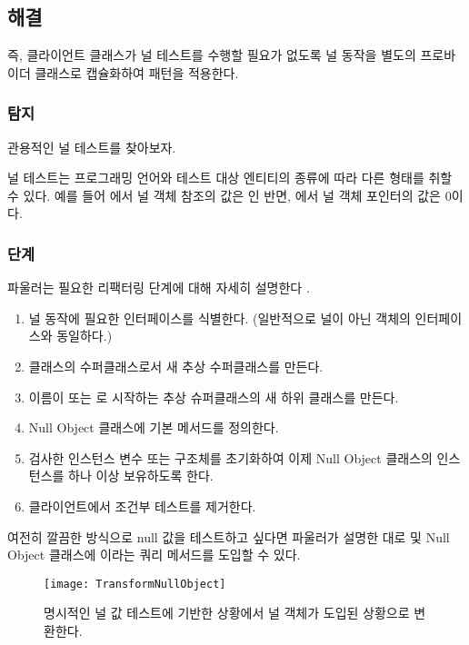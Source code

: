 \documentclass[a4paper,10pt,twoside]{book}
\begin{document}
\subsection*{해결}

즉, 클라이언트 클래스가 널 테스트를 수행할 필요가 없도록 널 동작을 별도의 프로바이더 클래스로 캡슐화하여  패턴을 적용한다.

\subsubsection*{탐지}

관용적인 널 테스트를 찾아보자. 

널 테스트는 프로그래밍 언어와 테스트 대상 엔티티의 종류에 따라 다른 형태를 취할 수 있다. 예를 들어 에서 널 객체 참조의 값은 인 반면, 에서 널 객체 포인터의 값은 0이다.

\subsubsection*{단계}

파울러는 필요한 리팩터링 단계에 대해 자세히 설명한다 \cite{Fowl99a}.
\begin{enumerate}
\item 널 동작에 필요한 인터페이스를 식별한다. (일반적으로 널이 아닌 객체의 인터페이스와 동일하다.)

\item {} 클래스의 수퍼클래스로서 새 추상 수퍼클래스를 만든다.

\item 이름이  또는 로 시작하는 추상 슈퍼클래스의 새 하위 클래스를 만든다.

\item Null Object 클래스에 기본 메서드를 정의한다.

\item 검사한 인스턴스 변수 또는 구조체를 초기화하여 이제 Null Object 클래스의 인스턴스를 하나 이상 보유하도록 한다.

\item 클라이언트에서 조건부 테스트를 제거한다.
\end{enumerate}

여전히 깔끔한 방식으로 null 값을 테스트하고 싶다면 파울러\cite{Fowl99a}가 설명한 대로  및 Null Object 클래스에 이라는 쿼리 메서드를 도입할 수 있다.

\begin{figure}
\begin{center}
\texttt{[image: TransformNullObject]}
\caption{명시적인 널 값 테스트에 기반한 상황에서 널 객체가 도입된 상황으로 변환한다.}
\end{center}
\end{figure}
\end{document}
